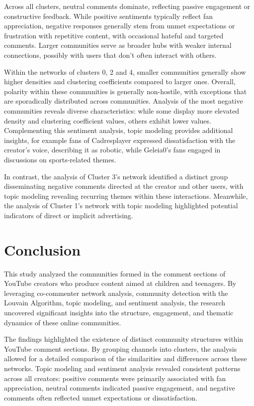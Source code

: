 \documentclass[sigconf]{acmart}
\begin{document}
Across all clusters, neutral comments dominate, reflecting passive engagement or constructive feedback.
While positive sentiments typically reflect fan appreciation, 
negative responses generally stem from unmet expectations or frustration with repetitive content, with 
occasional hateful and targeted comments. 
Larger communities serve as broader hubs with weaker internal connections,
possibly with users that don't often interact with others.

Within the networks of clusters 0, 2 and 4, smaller communities generally show higher densities and 
clustering coefficients compared to larger ones. Overall, polarity within these communities is generally 
non-hostile, with exceptions that are sporadically distributed across communities. 
Analysis of the most negative communities reveals diverse characteristics: 
while some display more elevated density and clustering coefficient values, 
others exhibit lower values. Complementing this sentiment analysis, topic modeling provides additional insights,
for example fans of Cadresplayer expressed dissatisfaction with the creator's voice, 
describing it as robotic, while Geleia0's fans engaged in discussions on sports-related themes.

In contrast, the analysis of Cluster 3's network identified a distinct group disseminating negative 
comments directed at the creator and other users, with topic modeling revealing recurring themes within 
these interactions. Meanwhile, the analysis of Cluster 1's network with topic modeling highlighted 
potential indicators of direct or implicit advertising.

\section{Conclusion}

This study analyzed the communities formed in the comment sections of YouTube creators who produce 
content aimed at children and teenagers. By leveraging co-commenter network analysis, community detection 
with the Louvain Algorithm, topic modeling, and sentiment analysis, the research uncovered significant 
insights into the structure, engagement, and thematic dynamics of these online communities.

The findings highlighted the existence of distinct community structures within YouTube comment sections. 
By grouping channels into clusters, the analysis allowed for a detailed comparison of the similarities 
and differences across these networks. Topic modeling and sentiment analysis revealed consistent 
patterns across all creators: positive comments were primarily associated with fan appreciation, 
neutral comments indicated passive engagement, and negative comments often reflected unmet expectations 
or dissatisfaction. 
\end{document}
